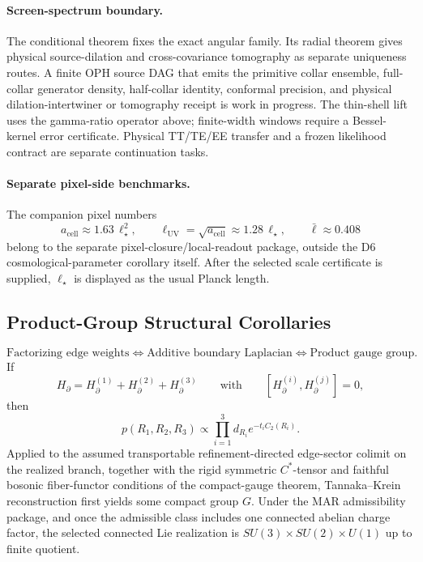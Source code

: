 \paragraph{Screen-spectrum boundary.}
The conditional theorem fixes the exact angular family. Its radial theorem gives physical
source-dilation and cross-covariance tomography as separate uniqueness routes. A finite OPH source
DAG that emits the primitive collar ensemble, full-collar generator density, half-collar identity,
conformal precision, and physical dilation-intertwiner or tomography receipt is work in progress.
The thin-shell lift uses the gamma-ratio operator above;
finite-width windows require a Bessel-kernel error certificate. Physical TT/TE/EE transfer and a
frozen likelihood contract are separate continuation tasks.

\paragraph{Separate pixel-side benchmarks.}
The companion pixel numbers
\[
a_{\mathrm{cell}}\approx 1.63\,\ell_\star^2,
\qquad
\ell_{\mathrm{UV}}=\sqrt{a_{\mathrm{cell}}}\approx 1.28\,\ell_\star,
\qquad
\bar{\ell}\approx 0.408
\]
belong to the separate pixel-closure/local-readout package, outside the D6 cosmological-parameter corollary itself. After the selected scale certificate is supplied, \(\ell_\star\) is displayed as the usual Planck length.

\subsection{Product-Group Structural Corollaries}

\begin{theorem}
\[
\text{Factorizing edge weights}
\Longleftrightarrow
\text{Additive boundary Laplacian}
\Longleftrightarrow
\text{Product gauge group}.
\]
If
\[
H_\partial=H_\partial^{(1)}+H_\partial^{(2)}+H_\partial^{(3)}
\qquad\text{with}\qquad
[H_\partial^{(i)},H_\partial^{(j)}]=0,
\]
then
\[
p(R_1,R_2,R_3)\propto\prod_{i=1}^3 d_{R_i}e^{-t_iC_2(R_i)}.
\]
Applied to the assumed transportable refinement-directed edge-sector colimit on the realized
branch, together with the rigid symmetric
\(C^*\)-tensor and faithful bosonic fiber-functor conditions of the compact-gauge theorem,
Tannaka--Krein reconstruction first yields some compact group \(G\). Under the MAR admissibility
package, and once the admissible class includes one connected abelian charge factor, the selected
connected Lie realization is \(SU(3)\times SU(2)\times U(1)\) up to finite quotient.
\end{theorem}


